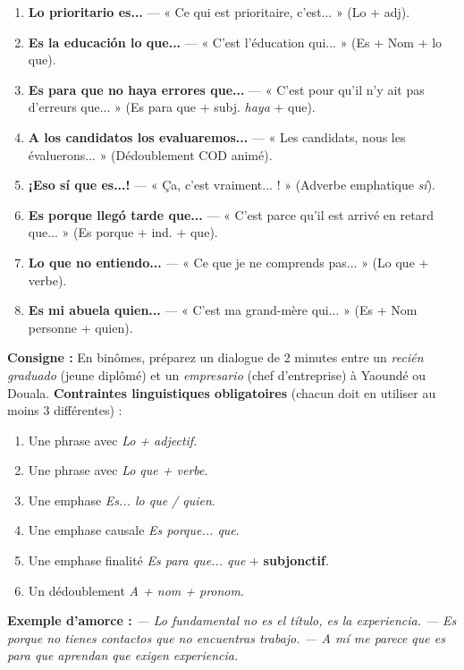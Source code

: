 \documentclass[11pt]{article}
\newcommand{\cle}[1]{{\popxbold\color{popdark}#1}}
\begin{document}
\begin{corrige}
\begin{enumerate}
    \item \textbf{Lo prioritario es...} — « Ce qui est prioritaire, c'est... » (\cle{Lo + adj}).
    \item \textbf{Es la educación lo que...} — « C'est l'éducation qui... » (\cle{Es + Nom + lo que}).
    \item \textbf{Es para que no haya errores que...} — « C'est pour qu'il n'y ait pas d'erreurs que... » (\cle{Es para que + subj. \emph{haya} + que}).
    \item \textbf{A los candidatos los evaluaremos...} — « Les candidats, nous les évaluerons... » (\cle{Dédoublement COD animé}).
    \item \textbf{¡Eso sí que es...!} — « Ça, c'est vraiment... ! » (\cle{Adverbe emphatique \emph{sí}}).
    \item \textbf{Es porque llegó tarde que...} — « C'est parce qu'il est arrivé en retard que... » (\cle{Es porque + ind. + que}).
    \item \textbf{Lo que no entiendo...} — « Ce que je ne comprends pas... » (\cle{Lo que + verbe}).
    \item \textbf{Es mi abuela quien...} — « C'est ma grand-mère qui... » (\cle{Es + Nom personne + quien}).
\end{enumerate}
\end{corrige}

\begin{experience}
\textbf{Consigne :} En binômes, préparez un dialogue de 2 minutes entre un \emph{recién graduado} (jeune diplômé) et un \emph{empresario} (chef d'entreprise) à Yaoundé ou Douala.
\textbf{Contraintes linguistiques obligatoires} (chacun doit en utiliser au moins 3 différentes) :
\begin{enumerate}
    \item Une phrase avec \emph{Lo + adjectif}.
    \item Une phrase avec \emph{Lo que + verbe}.
    \item Une emphase \emph{Es... lo que / quien}.
    \item Une emphase causale \emph{Es porque... que}.
    \item Une emphase finalité \emph{Es para que... que} + \textbf{subjonctif}.
    \item Un dédoublement \emph{A + nom + pronom}.
\end{enumerate}
\textbf{Exemple d'amorce :}
\emph{— Lo fundamental no es el título, es la experiencia.}
\emph{— Es porque no tienes contactos que no encuentras trabajo.}
\emph{— A mí me parece que es para que aprendan que exigen experiencia.}
\end{experience}
\end{document}
